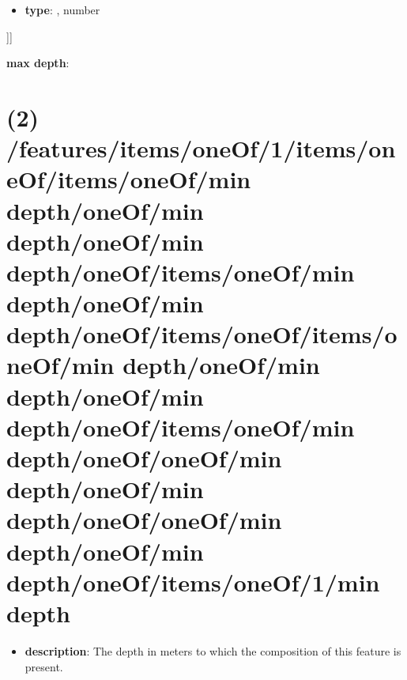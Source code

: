 \begin{itemize}[leftmargin=7em]\item {\bf type}: , number\end{itemize}]]\item {\bf max depth}: \section{(2) /features/items/oneOf/1/items/oneOf/items/oneOf/min depth/oneOf/min depth/oneOf/min depth/oneOf/items/oneOf/min depth/oneOf/min depth/oneOf/items/oneOf/items/oneOf/min depth/oneOf/min depth/oneOf/min depth/oneOf/items/oneOf/min depth/oneOf/oneOf/min depth/oneOf/min depth/oneOf/oneOf/min depth/oneOf/min depth/oneOf/items/oneOf/1/min depth}
\begin{itemize}[leftmargin=2em]\item {\bf description}: The depth in meters to which the composition of this feature is present.
\end{itemize}
